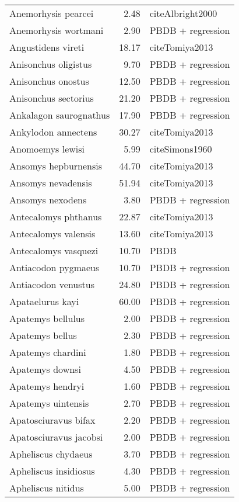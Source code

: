 \begin{table}[ht]
\begin{tabular}{lrl}
  Anemorhysis pearcei & 2.48 & cite{Albright2000} \\ 
  Anemorhysis wortmani & 2.90 & PBDB + regression \\ 
  Angustidens vireti & 18.17 & cite{Tomiya2013} \\ 
  Anisonchus oligistus & 9.70 & PBDB + regression \\ 
  Anisonchus onostus & 12.50 & PBDB + regression \\ 
  Anisonchus sectorius & 21.20 & PBDB + regression \\ 
  Ankalagon saurognathus & 17.90 & PBDB + regression \\ 
  Ankylodon annectens & 30.27 & cite{Tomiya2013} \\ 
  Anomoemys lewisi & 5.99 & cite{Simons1960} \\ 
  Ansomys hepburnensis & 44.70 & cite{Tomiya2013} \\ 
  Ansomys nevadensis & 51.94 & cite{Tomiya2013} \\ 
  Ansomys nexodens & 3.80 & PBDB + regression \\ 
  Antecalomys phthanus & 22.87 & cite{Tomiya2013} \\ 
  Antecalomys valensis & 13.60 & cite{Tomiya2013} \\ 
  Antecalomys vasquezi & 10.70 & PBDB \\ 
  Antiacodon pygmaeus & 10.70 & PBDB + regression \\ 
  Antiacodon venustus & 24.80 & PBDB + regression \\ 
  Apataelurus kayi & 60.00 & PBDB + regression \\ 
  Apatemys bellulus & 2.00 & PBDB + regression \\ 
  Apatemys bellus & 2.30 & PBDB + regression \\ 
  Apatemys chardini & 1.80 & PBDB + regression \\ 
  Apatemys downsi & 4.50 & PBDB + regression \\ 
  Apatemys hendryi & 1.60 & PBDB + regression \\ 
  Apatemys uintensis & 2.70 & PBDB + regression \\ 
  Apatosciuravus bifax & 2.20 & PBDB + regression \\ 
  Apatosciuravus jacobsi & 2.00 & PBDB + regression \\ 
  Apheliscus chydaeus & 3.70 & PBDB + regression \\ 
  Apheliscus insidiosus & 4.30 & PBDB + regression \\ 
  Apheliscus nitidus & 5.00 & PBDB + regression \\ 

\end{tabular}
\end{table}
